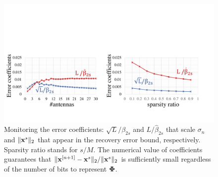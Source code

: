 \documentclass{article}
\begin{document}
\begin{figure}[t!]
\centering
\includegraphics[width=1\columnwidth, angle=0]{figs/beta.pdf}
\caption{Monitoring the error coefficients: $\sqrt{L}/\beta_{2s}$ and $L/\hat{\beta}_{2s}$ that scale $ \sigma_n$ and $\|{\bf x}^s \|_2$ that appear in the recovery error bound, respectively. Sparsity ratio stands for $s/M$. The numerical value of coefficients guarantees that $\|{\bf x}^{[n+1]}-{\bf x}^s\|_2/\|{\bf x}^s \|_2$ is sufficiently small regardless of the number of bits to represent ${\bf \Phi}$.}
\label{fig:beta}
\end{figure}
\end{document}
